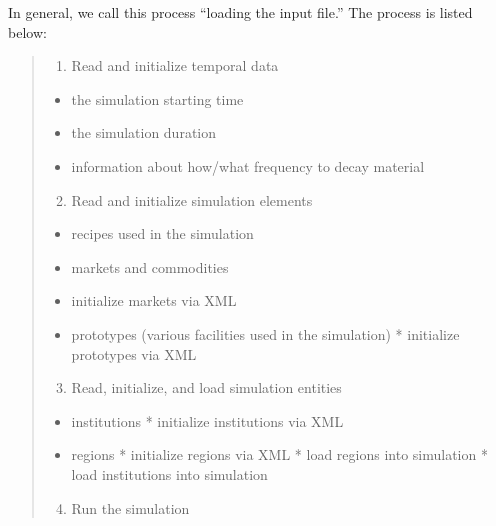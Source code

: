 \documentclass[letterpaper,10pt,english]{sphinxmanual}
\begin{document}
In general, we call this process ``loading the input file.'' The
process is listed below:
\begin{quote}
\begin{enumerate}
\item {} 
Read and initialize temporal data

\end{enumerate}
\begin{itemize}
\item {} 
the simulation starting time

\item {} 
the simulation duration

\item {} 
information about how/what frequency to decay material

\end{itemize}
\begin{enumerate}
\setcounter{enumi}{1}
\item {} 
Read and initialize simulation elements

\end{enumerate}
\begin{itemize}
\item {} 
recipes used in the simulation

\item {} 
markets and commodities

\item {} 
initialize markets via XML

\item {} 
prototypes (various facilities used in the simulation)
* initialize prototypes via XML

\end{itemize}
\begin{enumerate}
\setcounter{enumi}{2}
\item {} 
Read, initialize, and load simulation entities

\end{enumerate}
\begin{itemize}
\item {} 
institutions
* initialize institutions via XML

\item {} 
regions
* initialize regions via XML
* load regions into simulation
* load institutions into simulation

\end{itemize}
\begin{enumerate}
\setcounter{enumi}{3}
\item {} 
Run the simulation

\end{enumerate}
\end{quote}
\end{document}
